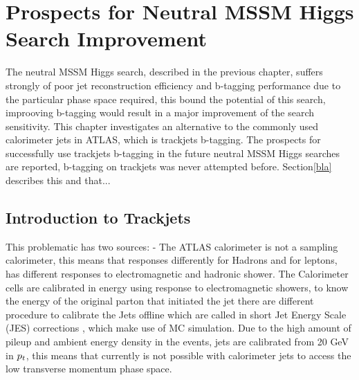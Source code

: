 \chapter{Prospects for Neutral MSSM Higgs Search Improvement}

The neutral MSSM Higgs search, described in the previous chapter, 
suffers strongly of poor jet reconstruction efficiency and  b-tagging performance due to the particular phase space
required, this bound the potential of this search, improoving b-tagging
would result in a major improvement of the search sensitivity. 
This chapter investigates an alternative to the commonly used calorimeter jets in ATLAS, 
which is trackjets b-tagging. 
The prospects for successfully use trackjets b-tagging in the future neutral MSSM Higgs searches are reported,
b-tagging on trackjets was never attempted before.
Section\ref{bla} describes this and that...


\clearpage

\section{Introduction to Trackjets}
This problematic has two sources:
- The ATLAS calorimeter is not a sampling calorimeter, this means that responses differently 
for Hadrons and for leptons, has different responses to electromagnetic and hadronic shower.
The Calorimeter cells are calibrated in energy using response to electromagnetic showers, to 
know the energy of the original parton that initiated the jet there are different procedure 
to calibrate the Jets offline which are called in short Jet Energy Scale (JES) corrections \cite{}, 
which make use of MC simulation.
Due to the high amount of pileup and ambient energy density in the events, jets are calibrated %
from 20 GeV in $p_{t}$, this means that currently is not possible with calorimeter jets to access the
low transverse momentum phase space.

